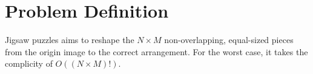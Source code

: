 \documentclass{article}
\begin{document}
\section{Problem Definition}

Jigsaw puzzles aims to reshape the $N\times M$ non-overlapping, equal-sized pieces from the origin image to the correct arrangement. For the worst case, it takes the complicity of $O((N\times M)!)$.





\end{document}
